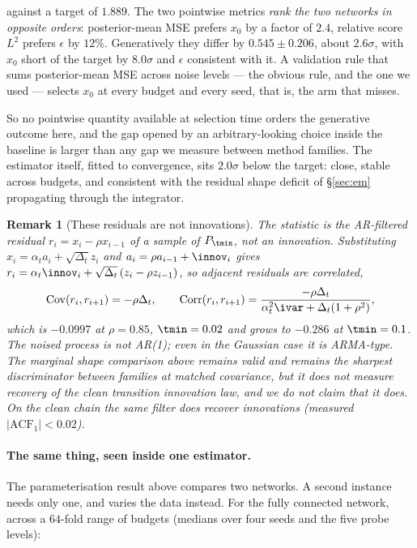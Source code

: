 \documentclass{article}
\newtheorem{remark}{Remark}
\begin{document}
\noindent
against a target of $1.889$. The two pointwise metrics \emph{rank the two networks in opposite
orders}: posterior-mean MSE prefers $x_0$ by a factor of $2.4$, relative score $L^2$ prefers
$\epsilon$ by $12\%$. Generatively they differ by $0.545\pm0.206$, about $2.6\sigma$, with $x_0$
short of the target by $8.0\sigma$ and $\epsilon$ consistent with it. A validation rule that sums
posterior-mean MSE across noise levels --- the obvious rule, and the one we used --- selects $x_0$
at every budget and every seed, that is, the arm that misses.

So no pointwise quantity available at selection time orders the generative outcome here, and the
gap opened by an arbitrary-looking choice inside the baseline is larger than any gap we measure
between method families. The estimator itself, fitted to convergence, sits $2.0\sigma$ below the
target: close, stable across budgets, and consistent with the residual shape deficit of
\S\ref{sec:em} propagating through the integrator.

\begin{remark}[These residuals are not innovations]
\label{rem:residuals}
The statistic is the AR-filtered residual $r_i=x_i-\rho x_{i-1}$ of a sample of $P_{\tmin}$, not
an innovation. Substituting $x_i=\alpha_t a_i+\sqrt{\Delta_t}z_i$ and $a_i=\rho a_{i-1}+\innov_i$
gives $r_i=\alpha_t\innov_i+\sqrt{\Delta_t}\,(z_i-\rho z_{i-1})$, so adjacent residuals are
correlated,
\[
  \operatorname{Cov}(r_i,r_{i+1})=-\rho\Delta_t,
  \qquad
  \operatorname{Corr}(r_i,r_{i+1})=\frac{-\rho\Delta_t}{\alpha_t^{2}\ivar+\Delta_t(1+\rho^{2})},
\]
which is $-0.0997$ at $\rho=0.85$, $\tmin=0.02$ and grows to $-0.286$ at $\tmin=0.1$. The noised
process is not AR(1); even in the Gaussian case it is ARMA-type. The marginal shape comparison
above remains valid and remains the sharpest discriminator between families at matched
covariance, but it does not measure recovery of the clean transition innovation law, and we do
not claim that it does. On the clean chain the same filter does recover innovations
(measured $|\mathrm{ACF}_1|<0.02$).
\end{remark}

\paragraph{The same thing, seen inside one estimator.} The parameterisation result above compares
two networks. A second instance needs only one, and varies the data instead. For the fully
connected network, across a $64$-fold range of budgets (medians over four seeds and the five
probe levels):
\end{document}
